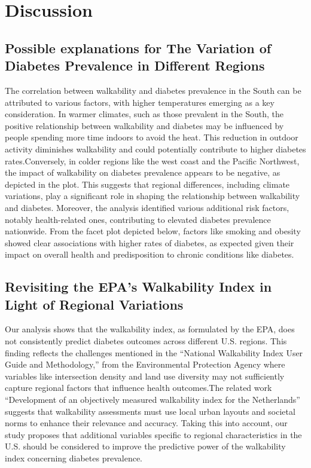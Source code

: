 \documentclass[
]{article}
\begin{document}
\section{Discussion}\label{discussion}

\subsection{Possible explanations for The Variation of Diabetes
Prevalence in Different
Regions}\label{possible-explanations-for-the-variation-of-diabetes-prevalence-in-different-regions}

The correlation between walkability and diabetes prevalence in the South
can be attributed to various factors, with higher temperatures emerging
as a key consideration. In warmer climates, such as those prevalent in
the South, the positive relationship between walkability and diabetes
may be influenced by people spending more time indoors to avoid the
heat. This reduction in outdoor activity diminishes walkability and
could potentially contribute to higher diabetes rates.Conversely, in
colder regions like the west coast and the Pacific Northwest, the impact
of walkability on diabetes prevalence appears to be negative, as
depicted in the plot. This suggests that regional differences, including
climate variations, play a significant role in shaping the relationship
between walkability and diabetes. Moreover, the analysis identified
various additional risk factors, notably health-related ones,
contributing to elevated diabetes prevalence nationwide. From the facet
plot depicted below, factors like smoking and obesity showed clear
associations with higher rates of diabetes, as expected given their
impact on overall health and predisposition to chronic conditions like
diabetes.

\subsection{Revisiting the EPA's Walkability Index in Light of Regional
Variations}\label{revisiting-the-epas-walkability-index-in-light-of-regional-variations}

Our analysis shows that the walkability index, as formulated by the EPA,
does not consistently predict diabetes outcomes across different U.S.
regions. This finding reflects the challenges mentioned in the
``National Walkability Index User Guide and Methodology,'' from the
Environmental Protection Agency where variables like intersection
density and land use diversity may not sufficiently capture regional
factors that influence health outcomes.The related work ``Development of
an objectively measured walkability index for the Netherlands'' suggests
that walkability assessments must use local urban layouts and societal
norms to enhance their relevance and accuracy. Taking this into account,
our study proposes that additional variables specific to regional
characteristics in the U.S. should be considered to improve the
predictive power of the walkability index concerning diabetes
prevalence.
\end{document}
